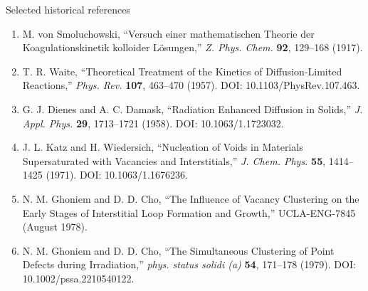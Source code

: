 \documentclass[aspectratio=169,11pt]{beamer}
\begin{document}
\begin{frame}{Selected historical references}
\small
\begin{enumerate}
\item M. von Smoluchowski, ``Versuch einer mathematischen Theorie der Koagulationskinetik kolloider L\"osungen,'' \emph{Z. Phys. Chem.} \textbf{92}, 129--168 (1917).
\item T. R. Waite, ``Theoretical Treatment of the Kinetics of Diffusion-Limited Reactions,'' \emph{Phys. Rev.} \textbf{107}, 463--470 (1957). DOI: 10.1103/PhysRev.107.463.
\item G. J. Dienes and A. C. Damask, ``Radiation Enhanced Diffusion in Solids,'' \emph{J. Appl. Phys.} \textbf{29}, 1713--1721 (1958). DOI: 10.1063/1.1723032.
\item J. L. Katz and H. Wiedersich, ``Nucleation of Voids in Materials Supersaturated with Vacancies and Interstitials,'' \emph{J. Chem. Phys.} \textbf{55}, 1414--1425 (1971). DOI: 10.1063/1.1676236.
\item N. M. Ghoniem and D. D. Cho, ``The Influence of Vacancy Clustering on the Early Stages of Interstitial Loop Formation and Growth,'' UCLA-ENG-7845 (August 1978).
\item N. M. Ghoniem and D. D. Cho, ``The Simultaneous Clustering of Point Defects during Irradiation,'' \emph{phys. status solidi (a)} \textbf{54}, 171--178 (1979). DOI: 10.1002/pssa.2210540122.
\end{enumerate}
\end{frame}
\end{document}
